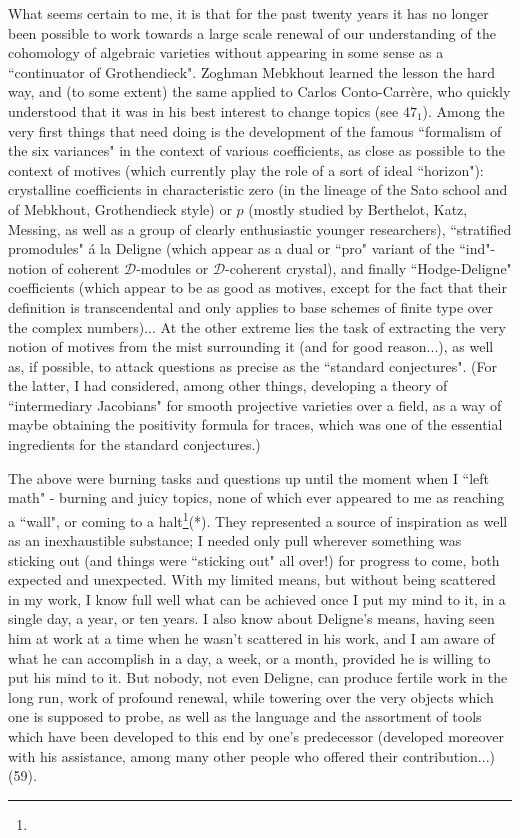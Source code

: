 What seems certain to me, it is that for the past twenty years it has no longer been possible to work towards a large scale renewal of our understanding of the cohomology of algebraic varieties without appearing in some sense as a ``continuator of Grothendieck". Zoghman Mebkhout learned the lesson the hard way, and (to some extent) the same applied to Carlos Conto-Carr\`ere, who quickly understood that it was in his best interest to change topics (see $47_1$). Among the very first things that need doing is the development of the famous ``formalism of the six variances" in the context of various coefficients, as close as possible to the context of motives (which currently play the role of a sort of ideal ``horizon"): crystalline coefficients in characteristic zero (in the lineage of the Sato school and of Mebkhout, Grothendieck style) or $p$ (mostly studied by Berthelot, Katz, Messing, as well as a group of clearly enthusiastic younger researchers), ``stratified promodules" \'a la Deligne (which appear as a dual or ``pro" variant of the ``ind"-notion of coherent $\mathcal{D}$-modules or $\mathcal{D}$-coherent crystal), and finally ``Hodge-Deligne" coefficients (which appear to be as good as motives, except for the fact that their definition is transcendental and only applies to base schemes of finite type over the complex numbers)... At the other extreme lies the task of extracting the very notion of motives from the mist surrounding it (and for good reason...), as well as, if possible, to attack questions as precise as the ``standard conjectures". (For the latter, I had considered, among other things, developing a theory of ``intermediary Jacobians" for smooth projective varieties over a field, as a way of maybe obtaining the positivity formula for traces, which was one of the essential ingredients for the standard conjectures.)

The above were burning tasks and questions up until the moment when I ``left math" - burning and juicy topics, none of which ever appeared to me as reaching a ``wall", or coming to a halt\footnote{}(*). They represented a source of inspiration as well as an inexhaustible substance; I needed only pull wherever something was sticking out (and things were ``sticking out" all over!) for progress to come, both expected and unexpected. With my limited means, but without being scattered in my work, I know full well what can be achieved once I put my mind to it, in a single day, a year, or ten years. I also know about Deligne's means, having seen him at work at a time when he wasn't scattered in his work, and I am aware of what he can accomplish in a day, a week, or a month, provided he is willing to put his mind to it. But nobody, not even Deligne, can produce fertile work in the long run, work of profound renewal, while towering over the very objects which one is supposed to probe, as well as the language and the assortment of tools which have been developed to this end by one's predecessor (developed moreover with his assistance, among many other people who offered their contribution...) (59).

